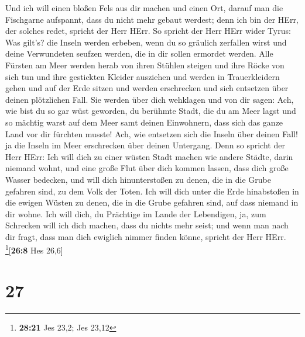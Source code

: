  Und ich will einen bloßen Fels aus dir machen und einen
Ort, darauf man die Fischgarne aufspannt, dass du nicht mehr gebaut
werdest; denn ich bin der HErr, der solches redet, spricht der Herr
HErr.  So spricht der Herr HErr wider Tyrus: Was gilt's?
die Inseln werden erbeben, wenn du so gräulich zerfallen wirst und deine
Verwundeten seufzen werden, die in dir sollen ermordet werden.
 Alle Fürsten am Meer werden herab von ihren Stühlen
steigen und ihre Röcke von sich tun und ihre gestickten Kleider
ausziehen und werden in Trauerkleidern gehen und auf der Erde sitzen und
werden erschrecken und sich entsetzen über deinen plötzlichen Fall.
 Sie werden über dich wehklagen und von dir sagen: Ach,
wie bist du so gar wüst geworden, du berühmte Stadt, die du am Meer
lagst und so mächtig warst auf dem Meer samt deinen Einwohnern, dass
sich das ganze Land vor dir fürchten musste!  Ach, wie
entsetzen sich die Inseln über deinen Fall! ja die Inseln im Meer
erschrecken über deinen Untergang.  Denn so spricht der
Herr HErr: Ich will dich zu einer wüsten Stadt machen wie andere Städte,
darin niemand wohnt, und eine große Flut über dich kommen lassen, dass
dich große Wasser bedecken,  und will dich hinunterstoßen
zu denen, die in die Grube gefahren sind, zu dem Volk der Toten. Ich
will dich unter die Erde hinabstoßen in die ewigen Wüsten zu denen, die
in die Grube gefahren sind, auf dass niemand in dir wohne. Ich will
dich, du Prächtige im Lande der Lebendigen,  ja, zum
Schrecken will ich dich machen, dass du nichts mehr seist; und wenn man
nach dir fragt, dass man dich ewiglich nimmer finden könne, spricht der
Herr HErr. \footnote{\textbf{28:21} Jes 23,2; Jes 23,12}{[}\textbf{26:8}
Hes 26,6{]}

\hypertarget{section-26}{%
\section{27}\label{section-26}}

